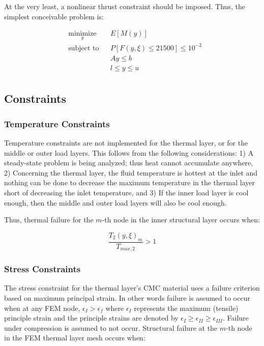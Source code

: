 \documentclass{article}
\begin{document}
At the very least, a nonlinear thrust constraint should be imposed. Thus, the simplest conceivable problem is:

\begin{equation}
\label{eq:simplest_reliable_optim}
\begin{aligned}
& \underset{y}{\text{minimize}}
& & E[M(y)] \\
& \text{subject to}
& & P \left[ F(y,\xi) \leq 21500 \right] \leq 10^{-2} \\
& & & Ay \leq b \\
& & & l \leq y \leq u \\
\end{aligned}
\end{equation}

\subsection{Constraints}

\subsubsection{Temperature Constraints}

Temperature constraints are not implemented for the thermal layer, or for the middle or outer load layers. This follows from the following considerations: 1) A steady-state problem is being analyzed; thus heat cannot accumulate anywhere, 2) Concerning the thermal layer, the fluid temperature is hottest at the inlet and nothing can be done to decrease the maximum temperature in the thermal layer short of decreasing the inlet temperature, and 3) If the inner load layer is cool enough, then the middle and outer load layers will also be cool enough.

Thus, thermal failure for the $m$-th node in the inner structural layer occurs when:

\begin{equation}
\frac{T_2 \left( y, \xi \right)_m}{T_{max,2}} > 1
\end{equation}

\subsubsection{Stress Constraints}

The stress constraint for the thermal layer's CMC material uses a failure criterion based on maximum principal strain. In other words failure is assumed to occur when at any FEM node, $\epsilon_I > \epsilon_f$ where $\epsilon_I$ represents the maximum (tensile) principle strain and the principle strains are denoted by $\epsilon_I \geq \epsilon_{II} \geq \epsilon_{III}$. Failure under compression is assumed to not occur. Structural failure at the $m$-th node in the FEM thermal layer mesh occurs when:
\end{document}

